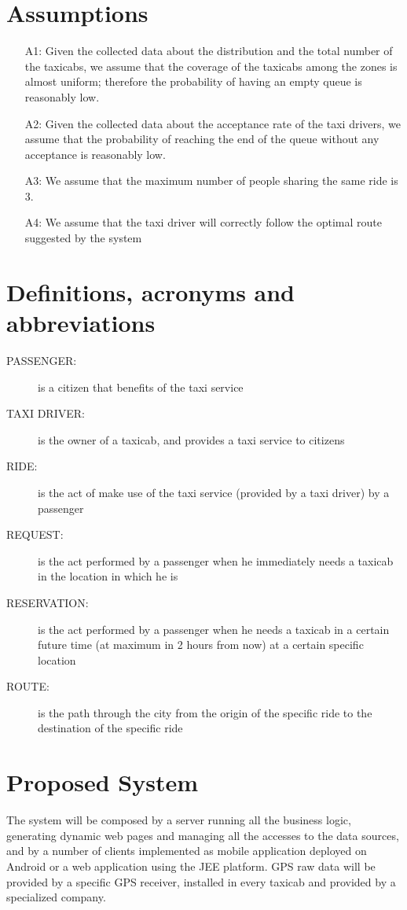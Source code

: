 \section{Assumptions}
\begin{itemize}
	\item [A1:] Given the collected data about the distribution and the total number of the taxicabs, we assume that the coverage of the taxicabs among the zones is almost uniform; therefore the probability of having an empty queue is reasonably low.
	\item [A2:] Given the collected data about the acceptance rate of the taxi drivers, we assume that the probability of reaching the end of the queue without any acceptance is reasonably low.
	\item [A3:] We assume that the maximum number of people sharing the same ride is 3.
	\item [A4:] We assume that the taxi driver will correctly follow the optimal route suggested by the system
\end{itemize}

\section{Definitions, acronyms and abbreviations}
\begin{description}
	\item[PASSENGER:] is a citizen that benefits of the taxi service
	\item[TAXI DRIVER:] is the owner of a taxicab, and provides a taxi service to citizens
	\item[RIDE:] is the act of make use of the taxi service (provided by a taxi driver) by a passenger
	\item[REQUEST:] is the act performed by a passenger when he immediately needs a taxicab in the location in which he is 
	\item[RESERVATION:] is the act performed by a passenger when he needs a taxicab in a certain future time (at maximum in 2 hours from now) at a certain specific location
	\item[ROUTE:] is the path through the city from the origin of the specific ride to the destination of the specific ride
\end{description}

\section{Proposed System}
The system will be composed by a server running all the business logic, generating dynamic web pages and managing all the accesses to the data sources, and by a number of clients implemented as mobile application deployed on Android or a web application using the JEE platform. GPS raw data will be provided by a specific GPS receiver, installed in every taxicab and provided by a specialized company.

